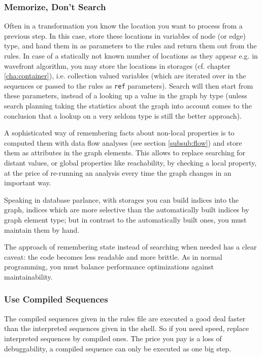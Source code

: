 \subsubsection*{Memorize, Don't Search}
Often in a transformation you know the location you want to process from a previous step.
In this case, store these locations in variables of node (or edge) type, and hand them in as parameters to the rules and return them out from the rules.
In case of a statically not known number of locations as they appear e.g. in wavefront algorithm, you may store the locations in storages (cf. chapter \ref{cha:container}), i.e. collection valued variables (which are iterated over in the sequences or passed to the rules as \texttt{ref} parameters).
Search will then start from these parameters, instead of a looking up a value in the graph by type (unless search planning taking the statistics about the graph into account comes to the conclusion  that a lookup on a very seldom type is still the better approach).

A sophisticated way of remembering facts about non-local properties is to computed them with data flow analyses (see section \ref{subsub:flow}) and store them as attributes in the graph elements.
This allows to replace searching for distant values, or global properties like reachability, by checking a local property, at the price of re-running an analysis every time the graph changes in an important way.

Speaking in database parlance, with storages you can build indices into the graph, indices which are more selective than the automatically built indices by graph element type; but in contrast to the automatically built ones, you must maintain them by hand.

The approach of remembering state instead of searching when needed has a clear caveat: the code becomes less readable and more brittle. As in normal programming, you must balance performance optimizations against maintainability.

\subsubsection*{Use Compiled Sequences}
The compiled sequences given in the rules file are executed a good deal faster than the interpreted sequences given in the shell.
So if you need speed, replace interpreted sequences by compiled ones.
The price you pay is a loss of debuggability, a compiled sequence can only be executed as one big step.

